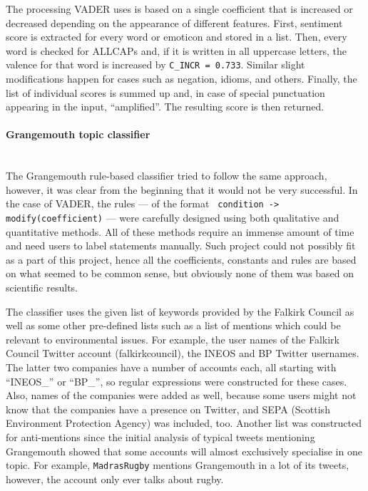 The processing VADER uses is based on a single coefficient that is increased or decreased depending on the appearance of different features. First, sentiment score is extracted for every word or emoticon and stored in a list. Then, every word is checked for ALLCAPs and, if it is written in all uppercase letters, the valence for that word is increased by \texttt{C\_INCR = 0.733}. Similar slight modifications happen for cases such as negation, idioms, and others. Finally, the list of individual scores is summed up and, in case of special punctuation appearing in the input, ``amplified''. The resulting score is then returned.

\paragraph{Grangemouth topic classifier}\mbox{}\\
The Grangemouth rule-based classifier tried to follow the same approach, however, it was clear from the beginning that it would not be very successful. In the case of VADER, the rules --- of the format \texttt{ condition -> modify(coefficient)} --- were carefully designed using both qualitative and quantitative methods. All of these methods require an immense amount of time and need users to label statements manually. Such project could not possibly fit as a part of this project, hence all the coefficients, constants and rules are based on what seemed to be common sense, but obviously none of them was based on scientific results. 

The classifier uses the given list of keywords provided by the Falkirk Council as well as some other pre-defined lists such as a list of mentions which could be relevant to environmental issues. For example, the user names of the Falkirk Council Twitter account (falkirkcouncil), the INEOS and BP Twitter usernames. The latter two companies have a number of accounts each, all starting with ``INEOS\_'' or ``BP\_'', so regular expressions were constructed for these cases. Also, names of the companies were added as well, because some users might not know that the companies have a presence on Twitter, and SEPA (Scottish Environment Protection Agency) was included, too. Another list was constructed for anti-mentions since the initial analysis of typical tweets mentioning Grangemouth showed that some accounts will almost exclusively specialise in one topic. For example, \texttt{MadrasRugby} mentions Grangemouth in a lot of its tweets, however, the account only ever talks about rugby.


